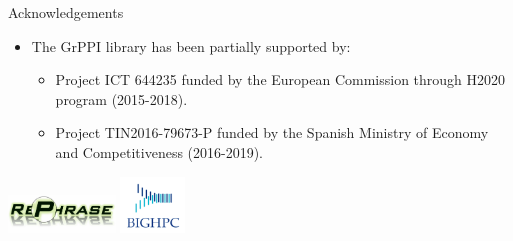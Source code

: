 \begin{frame}[t]{Acknowledgements}
\begin{itemize}
  \item The GrPPI library has been partially supported by:
    \begin{itemize}
      \vfill
      \item Project ICT 644235  
            funded by the European Commission through H2020 program (2015-2018).
      \vfill
      \item Project TIN2016-79673-P  
            funded by the Spanish Ministry of Economy and Competitiveness (2016-2019).
    \end{itemize}
\end{itemize}

\vfill
\begin{center}
\includegraphics[height=1cm]{logos/rephrase.jpg}
\hspace{1cm}
\includegraphics[height=1.5cm]{logos/bighpc.png}
\end{center}
\end{frame}

